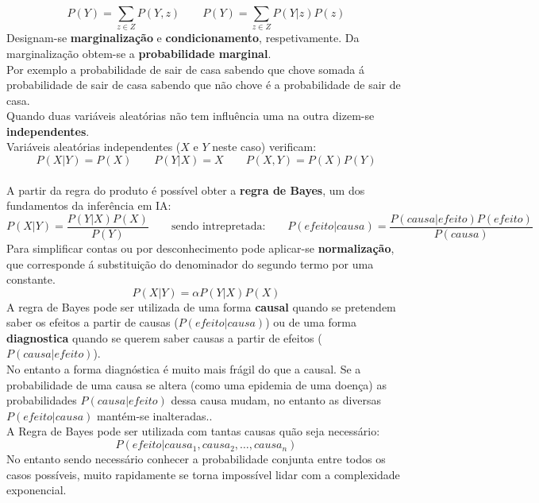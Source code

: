 \documentclass[]{report}
\begin{document}
$$P(Y) = \sum_{z \in Z}{P(Y, z)} \qquad P(Y) = \sum_{z \in Z}{P(Y| z)P(z)}$$
Designam-se \textbf{marginalização} e \textbf{condicionamento}, respetivamente. Da marginalização obtem-se a \textbf{probabilidade marginal}.\\
Por exemplo a probabilidade de sair de casa sabendo que chove somada á probabilidade de sair de casa sabendo que não chove é a probabilidade de sair de casa.\\[5mm]
Quando duas variáveis aleatórias não tem influência uma na outra dizem-se \textbf{independentes}.\\
Variáveis aleatórias independentes ($X$ e $Y$ neste caso) verificam:
$$P(X|Y)=P(X) \qquad P(Y|X)=X \qquad P(X,Y) = P(X)P(Y)$$\\[5mm]
A partir da regra do produto é possível obter a \textbf{regra de Bayes}, um dos fundamentos da inferência em IA:
$$P(X|Y)=\frac{P(Y|X)P(X)}{P(Y)} \qquad \text{sendo intrepretada:} \qquad 
P(\textit{efeito}|\textit{causa})=\frac{P(\textit{causa}|\textit{efeito})P(\textit{efeito})}{P(\textit{causa})}$$
Para simplificar contas ou por desconhecimento pode aplicar-se \textbf{normalização}, que corresponde á substituição do denominador do segundo termo por uma constante.
$$P(X|Y) = \alpha P(Y|X)P(X)$$
A regra de Bayes pode ser utilizada de uma forma \textbf{causal} quando se pretendem saber os efeitos a partir de causas ($P(\textit{efeito}|\textit{causa})$) ou de uma forma \textbf{diagnostica} quando se querem saber causas a partir de efeitos ($P(\textit{causa}|\textit{efeito})$).\\[2mm]
No entanto a forma diagnóstica é muito mais frágil do que a causal. Se a probabilidade de uma causa se altera (como uma epidemia de uma doença) as probabilidades $P(\textit{causa}|\textit{efeito})$ dessa causa mudam, no entanto as diversas $P(\textit{efeito}|\textit{causa})$ mantém-se inalteradas..\\[5mm]
A Regra de Bayes pode ser utilizada com tantas causas quão seja necessário:
$$P(\textit{efeito}|\textit{causa}_1,\textit{causa}_2, \dots, \textit{causa}_n)$$
No entanto sendo necessário conhecer a probabilidade conjunta entre todos os casos possíveis, muito rapidamente se torna impossível lidar com a complexidade exponencial.
\end{document}
